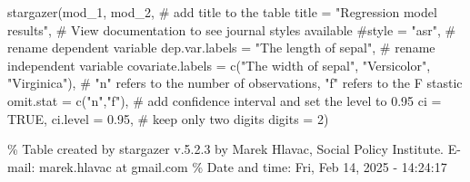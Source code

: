 \documentclass[
  letterpaper,
  DIV=11,
  numbers=noendperiod]{scrartcl}
\newenvironment{Shaded}{\begin{snugshade}}{\end{snugshade}}
\newcommand{\AttributeTok}[1]{\textcolor[rgb]{0.40,0.45,0.13}{#1}}
\newcommand{\CommentTok}[1]{\textcolor[rgb]{0.37,0.37,0.37}{#1}}
\newcommand{\ConstantTok}[1]{\textcolor[rgb]{0.56,0.35,0.01}{#1}}
\newcommand{\DecValTok}[1]{\textcolor[rgb]{0.68,0.00,0.00}{#1}}
\newcommand{\FloatTok}[1]{\textcolor[rgb]{0.68,0.00,0.00}{#1}}
\newcommand{\FunctionTok}[1]{\textcolor[rgb]{0.28,0.35,0.67}{#1}}
\newcommand{\NormalTok}[1]{\textcolor[rgb]{0.00,0.23,0.31}{#1}}
\newcommand{\StringTok}[1]{\textcolor[rgb]{0.13,0.47,0.30}{#1}}
\begin{document}
\begin{Shaded}
\begin{Highlighting}[]
\FunctionTok{stargazer}\NormalTok{(mod\_1, mod\_2,}
          \CommentTok{\# add title to the table}
          \AttributeTok{title =} \StringTok{"Regression model results"}\NormalTok{,}
          \CommentTok{\# View documentation to see journal styles available}
          \CommentTok{\#style = "asr",}
          \CommentTok{\# rename dependent variable}
          \AttributeTok{dep.var.labels =} \StringTok{"The length of sepal"}\NormalTok{,}
          \CommentTok{\# rename independent variable}
          \AttributeTok{covariate.labels =} \FunctionTok{c}\NormalTok{(}\StringTok{"The width of sepal"}\NormalTok{, }\StringTok{"Versicolor"}\NormalTok{, }\StringTok{"Virginica"}\NormalTok{),}
          \CommentTok{\# "n" refers to the number of observations, "f" refers to the F stastic}
          \AttributeTok{omit.stat =} \FunctionTok{c}\NormalTok{(}\StringTok{"n"}\NormalTok{,}\StringTok{"f"}\NormalTok{),}
          \CommentTok{\# add confidence interval and set the level to 0.95}
          \AttributeTok{ci =} \ConstantTok{TRUE}\NormalTok{, }\AttributeTok{ci.level =} \FloatTok{0.95}\NormalTok{,}
          \CommentTok{\# keep only two digits}
          \AttributeTok{digits =} \DecValTok{2}\NormalTok{)}
\end{Highlighting}
\end{Shaded}

\% Table created by stargazer v.5.2.3 by Marek Hlavac, Social Policy
Institute. E-mail: marek.hlavac at gmail.com \% Date and time: Fri, Feb
14, 2025 - 14:24:17
\end{document}
